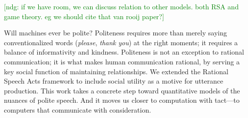 \documentclass[10pt,letterpaper]{article}
\newcommand{\ndg}[1]{\textcolor{Green}{[ndg: #1]}}
\begin{document}

\ndg{if we have room, we can discuss relation to other models. both RSA and game theory. eg we should cite that van rooij paper?}

Will machines ever be polite?
Politeness requires more than merely saying conventionalized words (\emph{please}, \emph{thank you}) at the right moments; it requires a balance of informativity and kindness.
Politeness is not an exception to rational communication; it is what makes human communication rational, by serving a key social function of maintaining relationships.
We extended the Rational Speech Acts framework to include social utility as a motive for utterance production.
This work takes a concrete step toward quantitative models of the nuances of polite speech.
And it moves us closer to computation with tact---to computers that communicate with consideration.



\setlength{\bibleftmargin}{.125in}
\setlength{\bibindent}{-\bibleftmargin}


\end{document}
